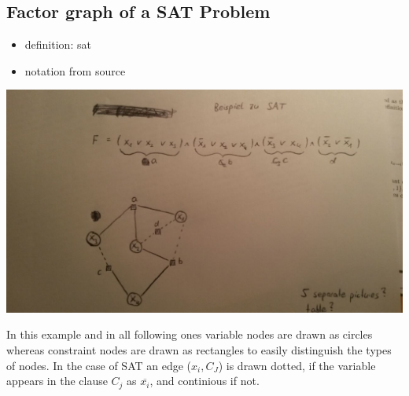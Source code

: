 \subsection{Factor graph of a SAT Problem}
\begin{itemize}
\item definition: sat
\item notation from source
\end{itemize}
\includegraphics[scale = 0.2]{img/SAT1}


In this example and in all following ones variable nodes are drawn as circles whereas constraint nodes are drawn as rectangles to easily distinguish the types of nodes. In the case of SAT an edge ($x_i, C_J$) is drawn dotted, if the variable appears in the clause $C_j$ as $\overline{x_i}$, and continious if not.



